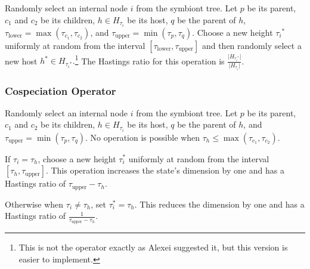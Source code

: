 \documentclass{article}
\begin{document}
                Randomly select an internal node $i$ from the symbiont tree.
                Let $p$ be its parent, $c_1$ and $c_2$ be its children, $h \in
                H_{\tau_i}$ be its host, $q$ be the parent of $h$,
                $\tau_\text{lower} = \max\left(\tau_{c_1},\tau_{c_2}\right)$,
                and $\tau_\text{upper} = \min\left(\tau_p,\tau_q\right)$.
                Choose a new height ${\tau_i}^*$ uniformly at random from
                the interval $\left[\tau_\text{lower},
                \tau_\text{upper}\right]$ and then randomly select a new host
                $h^* \in H_{{\tau_i}^*}.$\footnote{This is not the operator
                exactly as Alexei suggested it, but this version is easier to
                implement.} The Hastings ratio for this operation is
                $\frac{\lvert{H_{{\tau_i}^*}}\rvert}
                {\lvert{H_{\tau_i}}\rvert}$.

            \subsubsection*{Cospeciation Operator}

                Randomly select an internal node $i$ from the symbiont tree.
                Let $p$ be its parent, $c_1$ and $c_2$ be its children, $h \in
                H_{\tau_i}$ be its host, $q$ be the parent of $h$, and
                $\tau_\text{upper} = \min\left(\tau_p,\tau_q\right)$. No
                operation is possible when $\tau_h \leq
                \max\left(\tau_{c_1},\tau_{c_2}\right)$.

                If $\tau_i = \tau_h$, choose a new height $\tau_i^*$ uniformly
                at random from the interval $\left[\tau_h,
                \tau_\text{upper}\right]$. This operation increases the state's
                dimension by one and has a Hastings ratio of $\tau_\text{upper}
                - \tau_h$.

                Otherwise when $\tau_i \neq \tau_h$, set $\tau_i^* = \tau_h$.
                This reduces the dimension by one and has a Hastings ratio of
                $\frac{1}{\tau_\text{upper} - \tau_h}$.
\end{document}
